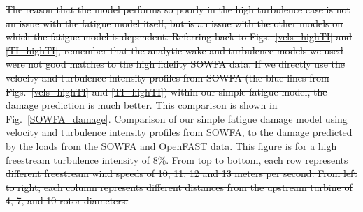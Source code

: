 \documentclass[11pt,letterpaper]{article}
\providecommand{\DIFdel}[1]{{\protect\color{red}\sout{#1}}}                      %
\providecommand{\DIFdelbegin}{} %
\providecommand{\DIFdelend}{} %
\providecommand{\DIFdelFL}[1]{\DIFdel{#1}} %
\newcommand{\DIFscaledelfig}{0.5}
\newlength{\DIFdelgraphicswidth} %
\newlength{\DIFdelgraphicsheight} %
\newcommand{\DIFdelincludegraphics}[2][]{%
\sbox{\DIFdelgraphicsbox}{\DIFOincludegraphics[#1]{#2}}%
\settoboxwidth{\DIFdelgraphicswidth}{\DIFdelgraphicsbox} %
\settoboxtotalheight{\DIFdelgraphicsheight}{\DIFdelgraphicsbox} %
\scalebox{\DIFscaledelfig}{%
\parbox[b]{\DIFdelgraphicswidth}{\usebox{\DIFdelgraphicsbox}\\[-\baselineskip] \rule{\DIFdelgraphicswidth}{0em}}\llap{\resizebox{\DIFdelgraphicswidth}{\DIFdelgraphicsheight}{%
\setlength{\unitlength}{\DIFdelgraphicswidth}%
\begin{picture}(1,1)%
\thicklines\linethickness{2pt} %
{\color[rgb]{1,0,0}\put(0,0){\framebox(1,1){}}}%
{\color[rgb]{1,0,0}\put(0,0){\line( 1,1){1}}}%
{\color[rgb]{1,0,0}\put(0,1){\line(1,-1){1}}}%
\end{picture}%
}\hspace*{3pt}}} %
} %
\DeclareRobustCommand{\DIFdelbegin}{\DIFOdelbegin \let\includegraphics\DIFdelincludegraphics} %
\DeclareRobustCommand{\DIFdelend}{\DIFOaddend \let\includegraphics\DIFOincludegraphics} %
\begin{document}
\DIFdelbegin \DIFdel{The reason that the model performs so poorly in the high turbulence case is not an issue with the fatigue model itself, but is an issue with the other models on which the fatigue model is dependent. Referring back to Figs.~\ref{vels_highTI} and \ref{TI_highTI}, remember that the analytic wake and turbulence models we used were not good matches to the high fidelity SOWFA data. If we directly use the velocity and turbulence intensity profiles from SOWFA (the blue lines from Figs.~\ref{vels_highTI} and \ref{TI_highTI}) within our simple fatigue model, the damage prediction is much better. This comparison is shown in Fig.~\ref{SOWFA_damage}.
}\DIFdelend %
% 
\DIFdelbegin %
{%
\DIFdelFL{Comparison of our simple fatigue damage model using velocity and turbulence intensity profiles from SOWFA, to the damage predicted by the loads from the SOWFA and OpenFAST data. This figure is for a high freestream turbulence intensity of 8\%. From top to bottom, each row represents different freestream wind speeds of 10, 11, 12 and 13 meters per second. From left to right, each column represents different distances from the upstream turbine of 4, 7, and 10 rotor diameters.}}
\DIFdelend %
\end{document}
